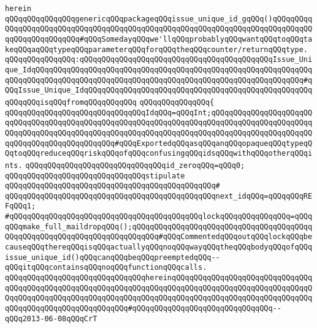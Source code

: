\verb|herein|\newline
\newline
\verb|qQQqqQQqqQQqqQQqgenericqQQqpackageqQQqissue_unique_id_gqQQq()qQQqqQQqqQQqqQQqqQQqqQQqqQQqqQQqqQQqqQQqqQQqqQQqqQQqqQQqqQQqqQQqqQQqqQQqqQQqqQQqqQQqqQQqqQQqqQQq#qQQqSomedayqQQqwe'llqQQqprobablyqQQqwantqQQqtoqQQqtakeqQQqaqQQqtypeqQQqparameterqQQqforqQQqtheqQQqcounter/returnqQQqtype.|\newline
\verb|qQQqqQQqqQQqqQQq:qQQqqQQqqQQqqQQqqQQqqQQqqQQqqQQqqQQqqQQqqQQqIssue_Unique_IdqQQqqQQqqQQqqQQqqQQqqQQqqQQqqQQqqQQqqQQqqQQqqQQqqQQqqQQqqQQqqQQqqQQqqQQqqQQqqQQqqQQqqQQqqQQqqQQqqQQqqQQqqQQqqQQqqQQqqQQqqQQqqQQqqQQq#qQQqIssue_Unique_IdqQQqqQQqqQQqqQQqqQQqqQQqqQQqqQQqqQQqqQQqqQQqqQQqqQQqqQQqqQQqisqQQqfromqQQqqQQqqQQq|\newline
\verb|qQQqqQQqqQQqqQQq{|\newline
\newline
\verb|qQQqqQQqqQQqqQQqqQQqqQQqqQQqqQQqIdqQQq=qQQqInt;qQQqqQQqqQQqqQQqqQQqqQQqqQQqqQQqqQQqqQQqqQQqqQQqqQQqqQQqqQQqqQQqqQQqqQQqqQQqqQQqqQQqqQQqqQQqqQQqqQQqqQQqqQQqqQQqqQQqqQQqqQQqqQQqqQQqqQQqqQQqqQQqqQQqqQQqqQQqqQQqqQQqqQQqqQQqqQQqqQQqqQQqqQQq#qQQqExportedqQQqasqQQqanqQQqopaqueqQQqtypeqQQqtoqQQqreduceqQQqriskqQQqofqQQqconfusingqQQqidsqQQqwithqQQqotherqQQqints.|\newline
\verb|qQQqqQQqqQQqqQQqqQQqqQQqqQQqqQQqid_zeroqQQq=qQQq0;|\newline
\newline
\verb|qQQqqQQqqQQqqQQqqQQqqQQqqQQqqQQqstipulate|\newline
\verb|qQQqqQQqqQQqqQQqqQQqqQQqqQQqqQQqqQQqqQQqqQQqqQQq#|\newline
\verb|qQQqqQQqqQQqqQQqqQQqqQQqqQQqqQQqqQQqqQQqqQQqqQQqnext_idqQQq=qQQqqQQqREFqQQq1;|\newline
\verb|#qQQqqQQqqQQqqQQqqQQqqQQqqQQqqQQqqQQqqQQqqQQqlockqQQqqQQqqQQqqQQq=qQQqqQQqmake_full_maildropqQQq();qQQqqQQqqQQqqQQqqQQqqQQqqQQqqQQqqQQqqQQqqQQqqQQqqQQqqQQqqQQqqQQqqQQqqQQqqQQq#qQQqCommentedqQQqoutqQQqlockqQQqbecauseqQQqthereqQQqisqQQqactuallyqQQqnoqQQqwayqQQqtheqQQqbodyqQQqofqQQqissue_unique_id()qQQqcanqQQqbeqQQqpreemptedqQQq--qQQqitqQQqcontainsqQQqnoqQQqfunctionqQQqcalls.|\newline
\verb|qQQqqQQqqQQqqQQqqQQqqQQqqQQqqQQqhereinqQQqqQQqqQQqqQQqqQQqqQQqqQQqqQQqqQQqqQQqqQQqqQQqqQQqqQQqqQQqqQQqqQQqqQQqqQQqqQQqqQQqqQQqqQQqqQQqqQQqqQQqqQQqqQQqqQQqqQQqqQQqqQQqqQQqqQQqqQQqqQQqqQQqqQQqqQQqqQQqqQQqqQQqqQQqqQQqqQQqqQQqqQQqqQQqqQQqqQQq#qQQqqQQqqQQqqQQqqQQqqQQqqQQqqQQq--qQQq2013-06-08qQQqCrT|\newline
